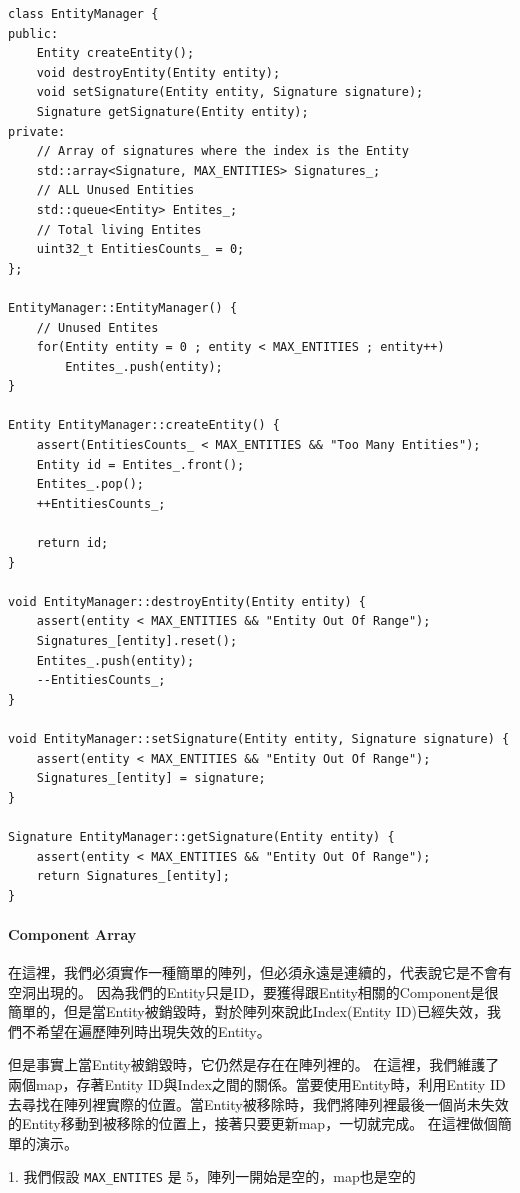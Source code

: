 \begin{lstlisting}
class EntityManager {
public:	
    Entity createEntity();
    void destroyEntity(Entity entity);
    void setSignature(Entity entity, Signature signature);
    Signature getSignature(Entity entity);
private: 
    // Array of signatures where the index is the Entity
    std::array<Signature, MAX_ENTITIES> Signatures_;
    // ALL Unused Entities
    std::queue<Entity> Entites_;
    // Total living Entites
    uint32_t EntitiesCounts_ = 0;
};

EntityManager::EntityManager() {
    // Unused Entites
    for(Entity entity = 0 ; entity < MAX_ENTITIES ; entity++)
        Entites_.push(entity);
}

Entity EntityManager::createEntity() {
    assert(EntitiesCounts_ < MAX_ENTITIES && "Too Many Entities");
    Entity id = Entites_.front();
    Entites_.pop();
    ++EntitiesCounts_;

    return id;
}

void EntityManager::destroyEntity(Entity entity) {
    assert(entity < MAX_ENTITIES && "Entity Out Of Range");
    Signatures_[entity].reset();
    Entites_.push(entity);
    --EntitiesCounts_;
}

void EntityManager::setSignature(Entity entity, Signature signature) {
    assert(entity < MAX_ENTITIES && "Entity Out Of Range");
    Signatures_[entity] = signature;
}

Signature EntityManager::getSignature(Entity entity) {
    assert(entity < MAX_ENTITIES && "Entity Out Of Range");
    return Signatures_[entity];
}
\end{lstlisting}

\paragraph{Component Array}
在這裡，我們必須實作一種簡單的陣列，但必須永遠是連續的，代表說它是不會有空洞出現的。
因為我們的Entity只是ID，要獲得跟Entity相關的Component是很簡單的，但是當Entity被銷毀時，對於陣列來說此Index(Entity ID)已經失效，我們不希望在遍歷陣列時出現失效的Entity。

但是事實上當Entity被銷毀時，它仍然是存在在陣列裡的。
在這裡，我們維護了兩個map，存著Entity ID與Index之間的關係。當要使用Entity時，利用Entity ID去尋找在陣列裡實際的位置。當Entity被移除時，我們將陣列裡最後一個尚未失效的Entity移動到被移除的位置上，接著只要更新map，一切就完成。
在這裡做個簡單的演示。

1. 我們假設 \lstinline{MAX_ENTITES} 是 5，陣列一開始是空的，map也是空的

